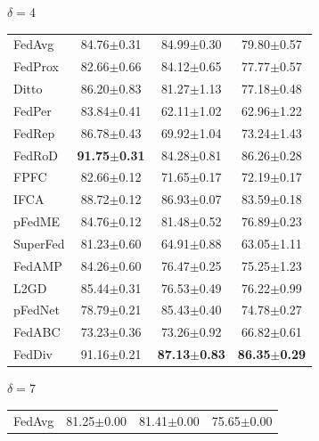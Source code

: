 \documentclass[journal]{IEEEtran}
\begin{document}
\begin{table}
	\begin{subtable}[]{$\delta=4$}
		\begin{tabular}{lccc}
			\specialrule{0em}{3pt}{1pt}
			\toprule
			FedAvg   & 84.76$\pm$0.31          & 84.99$\pm$0.30          & 79.80$\pm$0.57          \\
			FedProx  & 82.66$\pm$0.66          & 84.12$\pm$0.65          & 77.77$\pm$0.57          \\
			Ditto    & 86.20$\pm$0.83          & 81.27$\pm$1.13          & 77.18$\pm$0.48          \\
			FedPer   & 83.84$\pm$0.41          & 62.11$\pm$1.02          & 62.96$\pm$1.22          \\
			FedRep   & 86.78$\pm$0.43          & 69.92$\pm$1.04          & 73.24$\pm$1.43          \\
			FedRoD   & \textbf{91.75$\pm$0.31} & 84.28$\pm$0.81          & 86.26$\pm$0.28          \\
			FPFC     & 82.66$\pm$0.12          & 71.65$\pm$0.17          & 72.19$\pm$0.17          \\
			IFCA     & 88.72$\pm$0.12          & 86.93$\pm$0.07          & 83.59$\pm$0.18          \\
			pFedME   & 84.76$\pm$0.12          & 81.48$\pm$0.52          & 76.89$\pm$0.23          \\
			SuperFed & 81.23$\pm$0.60          & 64.91$\pm$0.88          & 63.05$\pm$1.11          \\
			FedAMP   & 84.26$\pm$0.60          & 76.47$\pm$0.25          & 75.25$\pm$1.23          \\
			L2GD   & 85.44$\pm$0.31          & 76.53$\pm$0.49          & 76.22$\pm$0.99          \\
			pFedNet  & 78.79$\pm$0.21          & 85.43$\pm$0.40          & 74.78$\pm$0.27          \\
			FedABC   & 73.23$\pm$0.36          & 73.26$\pm$0.92          & 66.82$\pm$0.61          \\ %
			FedDiv   & 91.16$\pm$0.21 & \textbf{87.13$\pm$0.83} & \textbf{86.35$\pm$0.29} \\ \bottomrule
		\end{tabular}
	\end{subtable}
	\centering
	\begin{subtable}[]{$\delta=7$}
		\begin{tabular}{lccc}
			\specialrule{0em}{3pt}{1pt}
			\toprule
			FedAvg   & 81.25$\pm$0.00          & 81.41$\pm$0.00          & 75.65$\pm$0.00          \\

\end{tabular}
\end{subtable}
\end{table}
\end{document}
